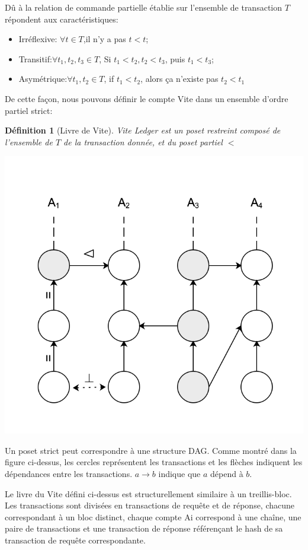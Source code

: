 \documentclass[UTF8,nofonts]{article}
\makeatletter
\newtheorem{definition}{Définition}[section]
\newenvironment{figurehere}
 {\def\@captype{figure}}
 {}
\makeatother
\begin{document}
\begin{multicols}{2}
Dû à la relation de commande partielle établie sur l'ensemble de transaction $T$ répondent aux caractéristiques:
\begin{itemize}
	\item Irréflexive: $\forall t \in T$,il n'y a pas $t < t$;
	\item Transitif:$\forall t_{1},t_{2},t_{3} \in T$, Si $t_{1}<t_{2},t_{2}<t_{3}$, puis $t_{1}<t_{3}$;
	\item Asymétrique:$\forall t_{1},t_{2} \in T$, if $t_{1}<t_{2}$, alors ça n'existe pas $t_{2}<t_{1}$
\end{itemize}

De cette façon, nous pouvons définir le compte Vite dans un ensemble d'ordre partiel strict:

\begin{definition}[Livre de Vite]
Vite Ledger est un poset restreint composé de l'ensemble de $T$ de la transaction donnée, et du poset partiel $<$ 
\end{definition}

\begin{center}
\begin{figurehere}
\includegraphics[width=.7\linewidth]{image/ledger.png}
\caption{La relation entre le livre et la transaction à Vite}
\end{figurehere}
\end{center}

Un poset strict peut correspondre à une structure DAG. Comme montré dans la figure ci-dessus, les cercles représentent les transactions et les flèches indiquent les dépendances entre les transactions. $a \rightarrow b$ indique que $a$ dépend à $b$.

Le livre du Vite défini ci-dessus est structurellement similaire à un treillis-bloc. Les transactions sont divisées en transactions de requête et de réponse, chacune correspondant à un bloc distinct, chaque compte Ai correspond à une chaîne, une paire de transactions et une transaction de réponse référençant le hash de sa transaction de requête correspondante.


\end{multicols}
\end{document}
